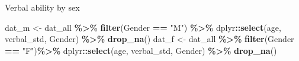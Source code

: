 \documentclass[
]{article}
\newenvironment{Shaded}{\begin{snugshade}}{\end{snugshade}}
\newcommand{\FunctionTok}[1]{\textcolor[rgb]{0.13,0.29,0.53}{\textbf{#1}}}
\newcommand{\NormalTok}[1]{#1}
\newcommand{\OtherTok}[1]{\textcolor[rgb]{0.56,0.35,0.01}{#1}}
\newcommand{\SpecialCharTok}[1]{\textcolor[rgb]{0.81,0.36,0.00}{\textbf{#1}}}
\newcommand{\StringTok}[1]{\textcolor[rgb]{0.31,0.60,0.02}{#1}}
\begin{document}
Verbal ability by sex

\begin{Shaded}
\begin{Highlighting}[]
\NormalTok{dat\_m }\OtherTok{\textless{}{-}}\NormalTok{ dat\_all }\SpecialCharTok{\%\textgreater{}\%} \FunctionTok{filter}\NormalTok{(Gender }\SpecialCharTok{==} \StringTok{"M"}\NormalTok{) }\SpecialCharTok{\%\textgreater{}\%}\NormalTok{  dplyr}\SpecialCharTok{::}\FunctionTok{select}\NormalTok{(age, verbal\_std, Gender) }\SpecialCharTok{\%\textgreater{}\%} \FunctionTok{drop\_na}\NormalTok{()}
\NormalTok{dat\_f }\OtherTok{\textless{}{-}}\NormalTok{ dat\_all }\SpecialCharTok{\%\textgreater{}\%}  \FunctionTok{filter}\NormalTok{(Gender }\SpecialCharTok{==} \StringTok{"F"}\NormalTok{)}\SpecialCharTok{\%\textgreater{}\%}\NormalTok{ dplyr}\SpecialCharTok{::}\FunctionTok{select}\NormalTok{(age, verbal\_std, Gender) }\SpecialCharTok{\%\textgreater{}\%} \FunctionTok{drop\_na}\NormalTok{()}



\end{Highlighting}
\end{Shaded}
\end{document}
